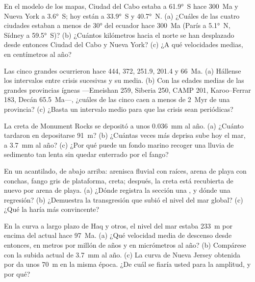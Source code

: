 \begin{exercise}[$\star$]\label{exo:b2:phanerozoic-earth:1}
En el modelo de los mapas, Ciudad del Cabo estaba a \ang{61.9}~S hace \qty{300}{Ma} y Nueva York a
\ang{3.6}~S; hoy están a \ang{33.9}~S y \ang{40.7}~N. (a) ¿Cuáles de las cuatro ciudades estaban
a menos de \ang{30} del ecuador hace \qty{300}{Ma} (París a \ang{5.1}~N, Sídney a
\ang{59.5}~S)? (b) ¿Cuántos kilómetros hacia el norte se han desplazado desde entonces Ciudad del Cabo y Nueva York?
(c) ¿A qué velocidades medias, en centímetros al año?
\end{exercise}

\begin{exercise}[$\star$]\label{exo:b2:phanerozoic-earth:2}
Las cinco grandes ocurrieron hace 444, 372, 251.9, 201.4 y \qty{66}{Ma}. (a) Hállense los intervalos entre
crisis sucesivas y su media. (b) Con las edades medias de las grandes provincias ígneas
---Emeishan 259, Siberia 250, CAMP 201, Karoo--Ferrar 183, Decán \qty{65.5}{Ma}---, ¿cuáles de las
cinco caen a menos de \qty{2}{Myr} de una provincia? (c) ¿Basta un intervalo medio para que las crisis sean periódicas?
\end{exercise}

\begin{exercise}[$\star$]\label{exo:b2:phanerozoic-earth:3}
La creta de Monument Rocks se depositó a unos \qty{0.036}{mm} al año. (a) ¿Cuánto tardaron en depositarse
\qty{91}{m}? (b) ¿Cuántas veces más deprisa sube hoy el mar, a \qty{3.7}{mm} al
año? (c) ¿Por qué puede un fondo marino recoger una lluvia de sedimento tan lenta sin quedar enterrado por el fango?
\end{exercise}

\begin{exercise}[$\star$]\label{exo:b2:phanerozoic-earth:4}
En un acantilado, de abajo arriba: arenisca fluvial con raíces, arena de playa con conchas, fango gris de
plataforma, creta; después, la creta está recubierta de nuevo por arena de playa. (a) ¿Dónde registra la sección una
, y dónde una regresión? (b) ¿Demuestra la transgresión que subió el nivel del mar
global? (c) ¿Qué la haría más convincente?
\end{exercise}

\begin{exercise}[$\star\star$]\label{exo:b2:phanerozoic-earth:5}
En la curva a largo plazo de Haq y otros, el nivel del mar estaba \qty{233}{m} por encima del actual hace
\qty{97}{Ma}. (a) ¿Qué velocidad media de descenso desde entonces, en metros por millón de años y en
micrómetros al año? (b) Compárese con la subida actual de \qty{3.7}{mm} al año. (c) La curva de
Nueva Jersey obtenida por  da unos \qty{70}{m} en la misma época. ¿De cuál se fiaría usted para la
amplitud, y por qué?
\end{exercise}

